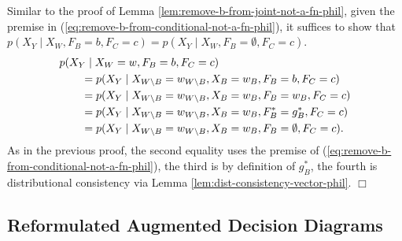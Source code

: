 \documentclass[11pt]{article}
\begin{document}
{ Similar to the proof of Lemma \ref{lem:remove-b-from-joint-not-a-fn-phil}, 
given the premise in (\ref{eq:remove-b-from-conditional-not-a-fn-phil}), it suffices to show that
$p(X_{Y}\mid X_W, F_B=b, F_C=c) = p(X_{Y}\mid X_W, F_B=\emptyset,F_C=c)$.
\begin{align*}
\MoveEqLeft{p(X_{Y} \mid X_W=w, F_B=b, F_C=c)}\\
 &= p(X_{Y} \mid X_{W\setminus B}=w_{W\setminus B}, X_{B}=w_{B}, F_B=b,F_C=c)\\ 
&= p(X_{Y} \mid X_{W\setminus B}=w_{W\setminus B}, X_{B}=w_{B}, F_B=w_{B}, F_C=c)\\ 
&= p(X_{Y} \mid X_{W\setminus B}=w_{W\setminus B}, X_{B}=w_{B}, F^*_B=g^*_B, F_C=c)\\ 
&= p(X_{Y} \mid X_{W\setminus B}=w_{W\setminus B}, X_{B}=w_{B}, F_B=\emptyset, F_C=c).
\end{align*}
As in the previous proof, the second equality uses the premise of (\ref{eq:remove-b-from-conditional-not-a-fn-phil}), the third is by definition of $g^*_B$, the fourth is distributional consistency via Lemma \ref{lem:dist-consistency-vector-phil}. \hfill$\Box$
\\

\subsection{Reformulated Augmented Decision Diagrams}


}
\end{document}
